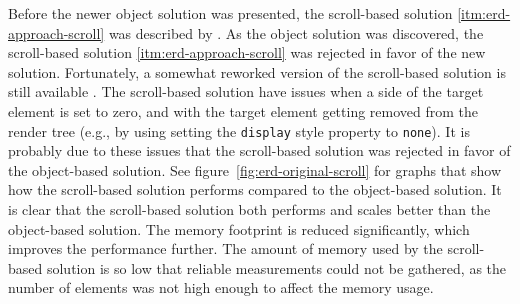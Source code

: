\documentclass[a4paper,11pt]{kth-mag}
\newcommand{\code}[1]{\texttt{#1}}
\begin{document}
        Before the newer object solution was presented, the scroll-based solution \ref{itm:erd-approach-scroll} was described by \cite{backalley}.
        As the object solution was discovered, the scroll-based solution \ref{itm:erd-approach-scroll} was rejected in favor of the new solution.
        Fortunately, a somewhat reworked version of the scroll-based solution is still available \cite{eq_imp_css-element-queries}.
        The scroll-based solution have issues when a side of the target element is set to zero, and with the target element getting removed from the render tree (e.g., by using setting the \code{display} style property to \code{none}).
        It is probably due to these issues that the scroll-based solution was rejected in favor of the object-based solution.
        See figure~\ref{fig:erd-original-scroll} for graphs that show how the scroll-based solution performs compared to the object-based solution.
        It is clear that the scroll-based solution both performs and scales better than the object-based solution.
        The memory footprint is reduced significantly, which improves the performance further.
        The amount of memory used by the scroll-based solution is so low that reliable measurements could not be gathered, as the number of elements was not high enough to affect the memory usage.
\end{document}
